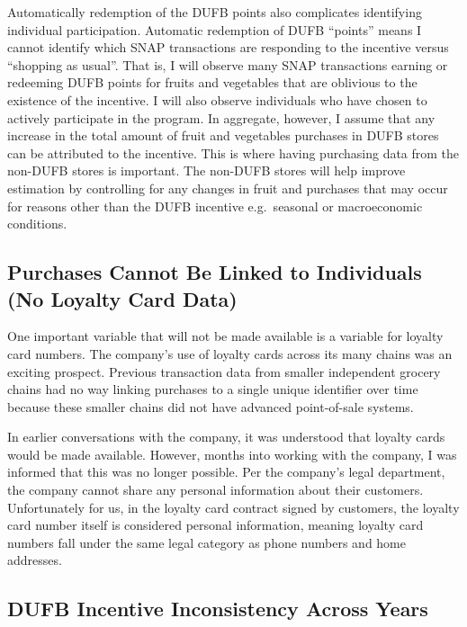 \documentclass[12pt,letterpaperpaper,]{book}
\begin{document}
Automatically redemption of the DUFB points also complicates identifying
individual participation. Automatic redemption of DUFB ``points'' means
I cannot identify which SNAP transactions are responding to the
incentive versus ``shopping as usual''. That is, I will observe many
SNAP transactions earning or redeeming DUFB points for fruits and
vegetables that are oblivious to the existence of the incentive. I will
also observe individuals who have chosen to actively participate in the
program. In aggregate, however, I assume that any increase in the total
amount of fruit and vegetables purchases in DUFB stores can be
attributed to the incentive. This is where having purchasing data from
the non-DUFB stores is important. The non-DUFB stores will help improve
estimation by controlling for any changes in fruit and purchases that
may occur for reasons other than the DUFB incentive e.g.~seasonal or
macroeconomic conditions.

\subsection*{Purchases Cannot Be Linked to Individuals (No Loyalty Card
Data)}\label{purchases-cannot-be-linked-to-individuals-no-loyalty-card-data}

One important variable that will not be made available is a variable for
loyalty card numbers. The company's use of loyalty cards across its many
chains was an exciting prospect. Previous transaction data from smaller
independent grocery chains had no way linking purchases to a single
unique identifier over time because these smaller chains did not have
advanced point-of-sale systems.

In earlier conversations with the company, it was understood that
loyalty cards would be made available. However, months into working with
the company, I was informed that this was no longer possible. Per the
company's legal department, the company cannot share any personal
information about their customers. Unfortunately for us, in the loyalty
card contract signed by customers, the loyalty card number itself is
considered personal information, meaning loyalty card numbers fall under
the same legal category as phone numbers and home addresses.

\subsection*{DUFB Incentive Inconsistency Across
Years}\label{dufb-incentive-inconsistency-across-years}
\end{document}
